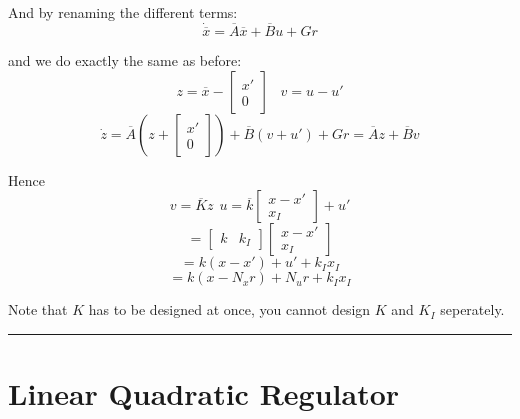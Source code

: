 \documentclass[a4paper]{article}
\begin{document}
And by renaming the different terms:
\begin{equation}
	\dot{\overline{x}} = \overline{A}\overline{x} + \overline{B}u + G r
\end{equation}

and we do exactly the same as before:
\begin{equation}
z = \overline{x} - \begin{bmatrix}
x' \\
0
\end{bmatrix} \hspace{10pt} v = u - u'
\end{equation}
\begin{equation}
\dot{z} = \overline{A}\left(z + \begin{bmatrix}
x' \\
0
\end{bmatrix} \right) + \overline{B} (v + u') + Gr = \overline{A}z + \overline{B}v
\end{equation}

Hence
\begin{equation}
	v = \overline{K}z \hspace{5pt} u = \overline{k} \begin{bmatrix}
	x - x' \\
	x_I
	\end{bmatrix} + u' 
\end{equation}
\begin{equation}
	= \begin{bmatrix}
	k & k_I 
	\end{bmatrix} \begin{bmatrix}
	x - x' \\  
	x_I
	\end{bmatrix} 
\end{equation}
\begin{equation}
= k(x-x') + u' + k_I x_I
\end{equation}
\begin{equation}
= k (x - N_x r) + N_u r + k_I x_I
\end{equation}


Note that $ K $ has to be designed at once, you cannot design  $ K $ and  $ K_I $ seperately.


\vspace{5pt}
\hrule
\vspace{5pt}

\section{Linear Quadratic Regulator}
\end{document}
